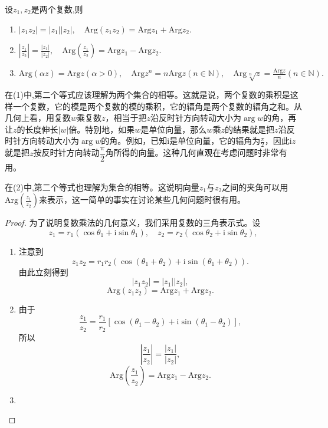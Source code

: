 \documentclass[../../main.tex]{subfiles}%
\begin{document}
\begin{theorem}\label{theorem:复数辐角的性质}
设$z_1,z_2$是两个复数,则
\begin{enumerate}[(1)]
\item $|z_1z_2| = |z_1||z_2|,\quad \mathrm{Arg}(z_1z_2) = \mathrm{Arg}z_1 + \mathrm{Arg}z_2.$

\item $\left| \frac{z_1}{z_2} \right| = \frac{|z_1|}{|z_2|},\quad 
\mathrm{Arg}\left( \frac{z_1}{z_2} \right) = \mathrm{Arg}z_1 - \mathrm{Arg}z_2.$

\item $\mathrm{Arg}\left( \alpha z \right) =\mathrm{Arg}z\left( \alpha >0 \right) ,\quad \mathrm{Arg}z^n=n\mathrm{Arg}z\left( n\in \mathbb{N} \right) ,\quad \mathrm{Arg}\sqrt[n]{z}=\frac{\mathrm{Arg}z}{n}\left( n\in \mathbb{N} \right).$
\end{enumerate}
\end{theorem}
\begin{note}
在(1)中,第二个等式应该理解为两个集合的相等。这就是说，两个复数的乘积是这样一个复数，它的模是两个复数的模的乘积，它的辐角是两个复数的辐角之和。从几何上看，用复数\(w\)乘复数\(z\)，相当于把\(z\)沿反时针方向转动大小为\(\arg w\)的角，再让\(z\)的长度伸长\(|w|\)倍。特别地，如果\(w\)是单位向量，那么\(w\)乘\(z\)的结果就是把\(z\)沿反时针方向转动大小为\(\arg w\)的角。例如，已知\(\mathrm{i}\)是单位向量，它的辐角为\(\frac{\pi}{2}\)，因此\(\mathrm{i}z\)就是把\(z\)按反时针方向转动\(\dfrac{\pi}{2}\)角所得的向量。这种几何直观在考虑问题时非常有用。

在(2)中,第二个等式也理解为集合的相等。这说明向量\(z_1\)与\(z_2\)之间的夹角可以用\(\mathrm{Arg}\left( \frac{z_1}{z_2} \right)\)来表示，这一简单的事实在讨论某些几何问题时很有用。
\end{note}
\begin{proof}
为了说明复数乘法的几何意义，我们采用复数的三角表示式。设
\[
z_1 = r_1(\cos\theta_1 + \mathrm{i}\sin\theta_1),
\quad
z_2 = r_2(\cos\theta_2 + \mathrm{i}\sin\theta_2),
\]
\begin{enumerate}[(1)]
\item 注意到
\[
z_1z_2 = r_1r_2(\cos(\theta_1 + \theta_2) + \mathrm{i}\sin(\theta_1 + \theta_2)).
\]
由此立刻得到
\[
|z_1z_2| = |z_1||z_2|,
\]
\[
\mathrm{Arg}(z_1z_2) = \mathrm{Arg}z_1 + \mathrm{Arg}z_2.
\]

\item 由于
\[
\frac{z_1}{z_2} = \frac{r_1}{r_2}[\cos(\theta_1 - \theta_2) + \mathrm{i}\sin(\theta_1 - \theta_2)],
\]
所以
\[
\left| \frac{z_1}{z_2} \right| = \frac{|z_1|}{|z_2|},
\]
\[
\mathrm{Arg}\left( \frac{z_1}{z_2} \right) = \mathrm{Arg}z_1 - \mathrm{Arg}z_2.
\]

\item 
\end{enumerate}
\end{proof}
\end{document}
